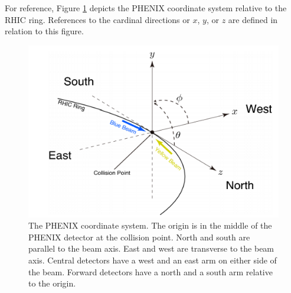 For reference, Figure \ref{fig:ch3_coord_sys} depicts the PHENIX coordinate system relative to the RHIC ring. References to the cardinal directions or $x$, $y$, or $z$ are defined in relation to this figure.
\begin{figure}[!ht]
\centering
\includegraphics[width=0.55\linewidth]{figs/phenix_coord.png}
\caption{The PHENIX coordinate system. The origin is in the middle of the PHENIX detector at the collision point. North and south are parallel to the beam axis. East and west are transverse to the beam axis. Central detectors have a west and an east arm on either side of the beam. Forward detectors have a north and a south arm relative to the origin.}
\label{fig:ch3_coord_sys}
\end{figure}

